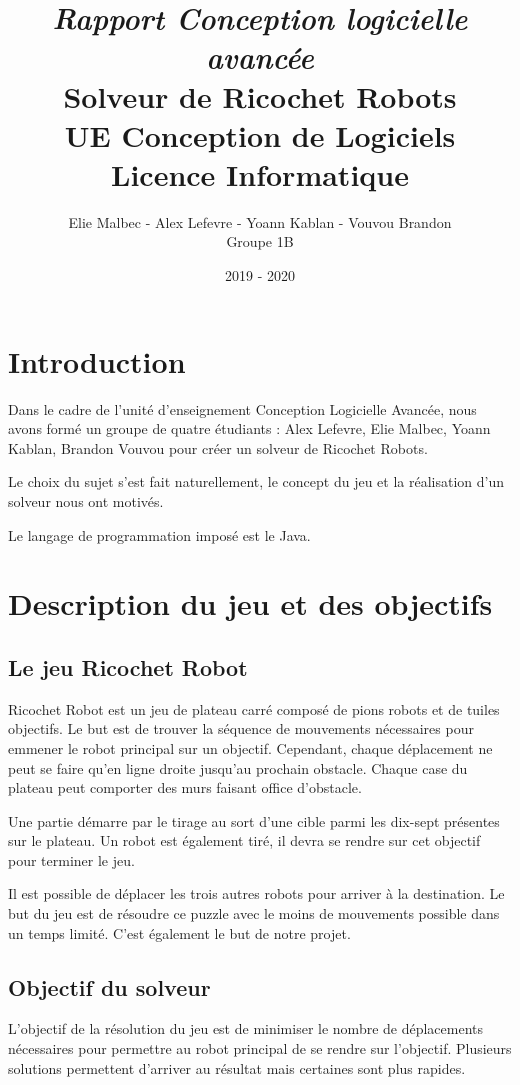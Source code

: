 \documentclass[a4paper]{article} %
\title{\vspace*{5cm}
\LARGE{\em{Rapport Conception logicielle avancée}}\\
Solveur de Ricochet Robots\\\vspace*{0.5cm}
UE Conception de Logiciels\\
Licence Informatique
}
\author{
Elie Malbec - Alex Lefevre -  Yoann Kablan - Vouvou Brandon\\
Groupe 1B
}
\date{2019 - 2020}
\begin{document}
\maketitle
\newpage
\tableofcontents
\newpage

\section{Introduction}
Dans le cadre de l'unité d'enseignement Conception Logicielle Avancée, nous avons formé un groupe de quatre étudiants : Alex Lefevre, Elie Malbec, Yoann Kablan, Brandon Vouvou pour créer un solveur de Ricochet Robots.

Le choix du sujet s'est fait naturellement, le concept du jeu et la réalisation d'un solveur nous ont motivés.

Le langage de programmation imposé est le Java.

\section{Description du jeu et des objectifs}
	\subsection{Le jeu Ricochet Robot}
Ricochet Robot est un jeu de plateau carré composé de pions robots et de tuiles objectifs. Le but est de trouver la séquence de mouvements nécessaires pour emmener le robot principal sur un objectif. Cependant, chaque déplacement ne peut se faire qu'en ligne droite jusqu'au prochain obstacle. Chaque case du plateau peut comporter des murs faisant office d'obstacle.

Une partie démarre par le tirage au sort d'une cible parmi les dix-sept présentes sur le plateau. Un robot est également tiré, il devra se rendre sur cet objectif pour terminer le jeu.

Il est possible de déplacer les trois autres robots pour arriver à la destination. Le but du jeu est de résoudre ce puzzle avec le moins de mouvements possible dans un temps limité. C'est également le but de notre projet.

	\subsection{Objectif du solveur}
L'objectif de la résolution du jeu est de minimiser le nombre de déplacements nécessaires pour permettre au robot principal de se rendre sur l'objectif. Plusieurs solutions permettent d'arriver au résultat mais certaines sont plus rapides.
\end{document}

